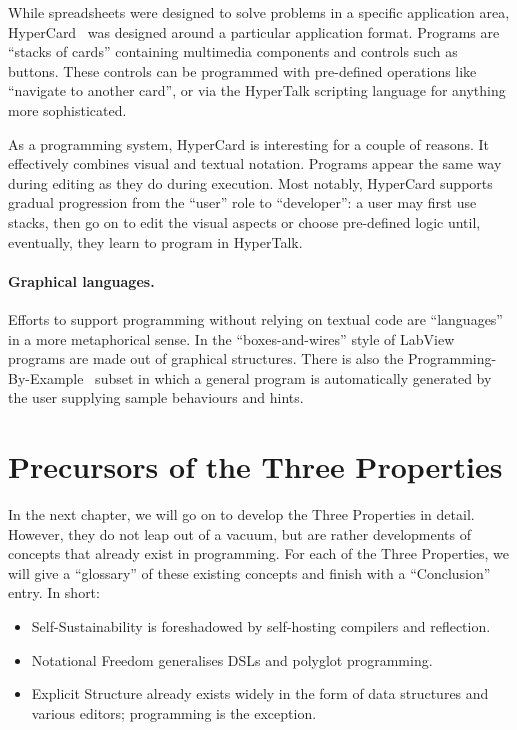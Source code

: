 \documentclass[ twoside,openright,titlepage,numbers=noenddot,headinclude,footinclude,cleardoublepage=empty,abstract=on,
                BCOR=5mm,paper=a4,fontsize=11pt
                ]{scrreprt}
\providecommand{\tightlist}{}\newenvironment{longtable}[2]{\begin{tabular}}{\end{tabular}}
\theoremstyle{definition}
\begin{document}
While spreadsheets were designed to solve problems in a specific
application area, HyperCard~\parencite{HyperCard} was designed around a
particular application format. Programs are ``stacks of cards''
containing multimedia components and controls such as buttons. These
controls can be programmed with pre-defined operations like ``navigate
to another card'', or via the HyperTalk scripting language for anything
more sophisticated.

As a programming system, HyperCard is interesting for a couple of
reasons. It effectively combines visual and textual notation. Programs
appear the same way during editing as they do during execution. Most
notably, HyperCard supports gradual progression from the ``user'' role
to ``developer'': a user may first use stacks, then go on to edit the
visual aspects or choose pre-defined logic until, eventually, they learn
to program in HyperTalk.

\paragraph{Graphical languages.}

Efforts to support programming without relying on textual code are
``languages'' in a more metaphorical sense. In the ``boxes-and-wires''
style of LabView~\parencite{LabView} programs are made out of graphical
structures. There is also the Programming-By-Example~\parencite{YWIMC}
subset in which a general program is automatically generated by the user
supplying sample behaviours and hints.

\hypertarget{precursors-of-the-three-properties}{\section{Precursors of the Three
Properties}\label{precursors-of-the-three-properties}}

In the next chapter, we will go on to develop the Three Properties in
detail. However, they do not leap out of a vacuum, but are rather
developments of concepts that already exist in programming. For each of
the Three Properties, we will give a ``glossary'' of these existing
concepts and finish with a ``Conclusion'' entry. In short:

\begin{itemize}
\tightlist
\item
  Self-Sustainability is foreshadowed by self-hosting compilers and
  reflection.
\item
  Notational Freedom generalises \acp{DSL} and polyglot programming.
\item
  Explicit Structure already exists widely in the form of data
  structures and various editors; programming is the exception.
\end{itemize}
\end{document}
